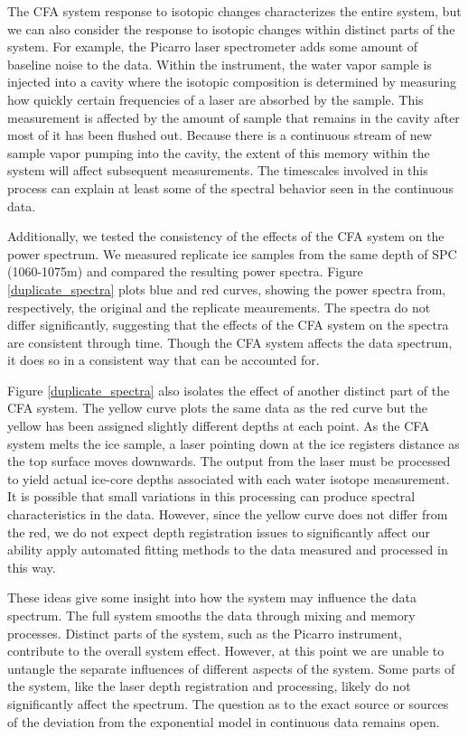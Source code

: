\documentclass[draft, jgrga]{AGUTeX}
\begin{document}
\begin{article}
The CFA system response to isotopic changes characterizes the entire system, but we can also consider the response to isotopic changes within distinct parts of the system. For example, the Picarro laser spectrometer adds some amount of baseline noise to the data. Within the instrument, the water vapor sample is injected into a cavity where the isotopic composition is determined by measuring how quickly certain frequencies of a laser are absorbed by the sample. This measurement is affected by the amount of sample that remains in the cavity after most of it has been flushed out. Because there is a continuous stream of new sample vapor pumping into the cavity, the extent of this memory within the system will affect subsequent measurements. The timescales involved in this process can explain at least some of the spectral behavior seen in the continuous data.

Additionally, we tested the consistency of the effects of the CFA system on the power spectrum. We measured replicate ice samples from the same depth of SPC (1060-1075m) and compared the resulting power spectra. Figure \ref{duplicate_spectra} plots blue and red curves, showing the power spectra from, respectively, the original and the replicate meaurements. The spectra do not differ significantly, suggesting that the effects of the CFA system on the spectra are consistent through time. Though the CFA system affects the data spectrum, it does so in a consistent way that can be accounted for.

Figure \ref{duplicate_spectra} also isolates the effect of another distinct part of the CFA system. The yellow curve plots the same data as the red curve but the yellow has been assigned slightly different depths at each point. As the CFA system melts the ice sample, a laser pointing down at the ice registers distance as the top surface moves downwards. The output from the laser must be processed to yield actual ice-core depths associated with each water isotope measurement. It is possible that small variations in this processing can produce spectral characteristics in the data. However, since the yellow curve does not differ from the red, we do not expect depth registration issues to significantly affect our ability apply automated fitting methods to the data measured and processed in this way.

These ideas give some insight into how the system may influence the data spectrum. The full system smooths the data through mixing and memory processes. Distinct parts of the system, such as the Picarro instrument, contribute to the overall system effect. However, at this point we are unable to untangle the separate influences of different aspects of the system. Some parts of the system, like the laser depth registration and processing, likely do not significantly affect the spectrum. The question as to the exact source or sources of the deviation from the exponential model in continuous data remains open.


\end{article}
\end{document}
